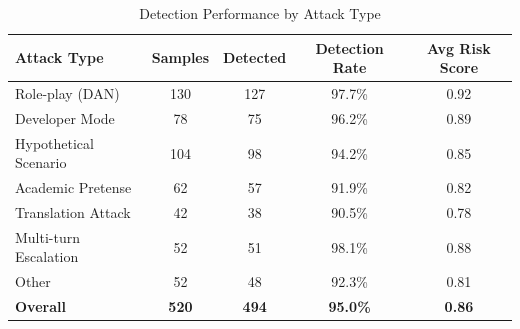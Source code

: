 
\begin{table}[h]
\centering
\caption{Detection Performance by Attack Type}
\label{tab:attack_types}
\begin{tabular}{lcccc}
\toprule
\textbf{Attack Type} & \textbf{Samples} & \textbf{Detected} & \textbf{Detection Rate} & \textbf{Avg Risk Score} \\
\midrule
Role-play (DAN) & 130 & 127 & 97.7\% & 0.92 \\
Developer Mode & 78 & 75 & 96.2\% & 0.89 \\
Hypothetical Scenario & 104 & 98 & 94.2\% & 0.85 \\
Academic Pretense & 62 & 57 & 91.9\% & 0.82 \\
Translation Attack & 42 & 38 & 90.5\% & 0.78 \\
Multi-turn Escalation & 52 & 51 & 98.1\% & 0.88 \\
Other & 52 & 48 & 92.3\% & 0.81 \\
\midrule
\textbf{Overall} & \textbf{520} & \textbf{494} & \textbf{95.0\%} & \textbf{0.86} \\
\bottomrule
\end{tabular}
\end{table}
